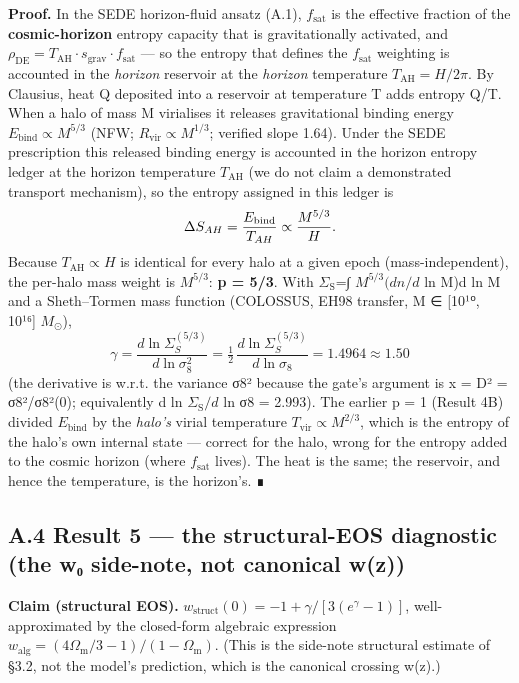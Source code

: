 \documentclass[
  10pt,
]{article}
\begin{document}
\textbf{Proof.} In the SEDE horizon-fluid ansatz (A.1),
\(f_{\mathrm{sat}}\) is the effective fraction of the
\textbf{cosmic-horizon} entropy capacity that is gravitationally
activated, and
\(\rho _{\mathrm{DE}} = T_{\mathrm{AH}}\cdot s_{\mathrm{grav}}\cdot f_{\mathrm{sat}}\)
--- so the entropy that defines the \(f_{\mathrm{sat}}\) weighting is
accounted in the \emph{horizon} reservoir at the \emph{horizon}
temperature \(T_{\mathrm{AH}} = H/2\pi\). By Clausius, heat Q deposited
into a reservoir at temperature T adds entropy Q/T. When a halo of mass
M virialises it releases gravitational binding energy
\(E_{\mathrm{bind}} \propto  M^{5/3}\) (NFW;
\(R_{\mathrm{vir}} \propto  M^{1/3}\); verified slope 1.64). Under the
SEDE prescription this released binding energy is accounted in the
horizon entropy ledger at the horizon temperature \(T_{\mathrm{AH}}\)
(we do not claim a demonstrated transport mechanism), so the entropy
assigned in this ledger is
\[\Delta S_{AH} = \frac{E_{\rm bind}}{T_{AH}} \propto \frac{M^{5/3}}{H}.\]
Because \(T_{\mathrm{AH}} \propto  H\) is identical for every halo at a
given epoch (mass-independent), the per-halo mass weight is \(M^{5/3}\):
\textbf{p = 5/3}. With \(\Sigma _{\mathrm{S}}\)=∫ \(M^{5/3}(dn/d\) ln
M)d ln M and a Sheth--Tormen mass function (COLOSSUS, EH98 transfer, M ∈
{[}10¹⁰, 10¹⁶{]} \(M_\odot\)),
\[\gamma = \frac{d\ln\Sigma_S^{(5/3)}}{d\ln\sigma_8^2} = \tfrac{1}{2}\,\frac{d\ln\Sigma_S^{(5/3)}}{d\ln\sigma_8} = 1.4964 \approx 1.50\]
(the derivative is w.r.t. the variance σ8² because the gate's argument
is x = D² = σ8²/σ8²(0); equivalently d ln \(\Sigma _{\mathrm{S}}/d\) ln
σ8 = 2.993). The earlier p = 1 (Result 4B) divided \(E_{\mathrm{bind}}\)
by the \emph{halo's} virial temperature
\(T_{\mathrm{vir}} \propto  M^{2/3}\), which is the entropy of the
halo's own internal state --- correct for the halo, wrong for the
entropy added to the cosmic horizon (where \(f_{\mathrm{sat}}\) lives).
The heat is the same; the reservoir, and hence the temperature, is the
horizon's. ∎

\subsection{A.4 Result 5 --- the structural-EOS diagnostic (the w₀
side-note, not canonical
w(z))}\label{a.4-result-5-the-structural-eos-diagnostic-the-wux2080-side-note-not-canonical-wz}

\textbf{Claim (structural EOS).}
\(w_{\mathrm{struct}}(0) = -1 + \gamma /[3(e^{\gamma } - 1)]\),
well-approximated by the closed-form algebraic expression
\(w_{\mathrm{alg}} = (4\Omega _{\mathrm{m}}/3 - 1)/(1 - \Omega _{\mathrm{m}})\).
(This is the side-note structural estimate of §3.2, not the model's
prediction, which is the canonical crossing w(z).)
\end{document}
